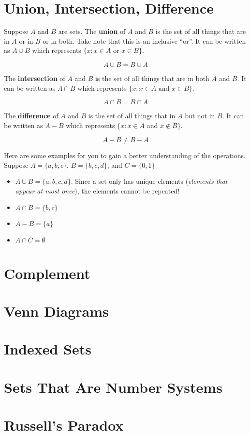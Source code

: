 \documentclass[../Latex-Setup/setup.tex]{subfiles}
\begin{document}
\section{Union, Intersection, Difference}

\indent Suppose $A$ and $B$ are sets. The \textbf{union} of $A$ and $B$ is the set of all things that are in $A$ or in $B$ or in both.
Take note that this is an inclusive ``or''. It can be written as $A \cup B$ which represents $\{x : x \in A \text{ or } x \in B\}$.\par

\[A \cup B = B \cup A\]
\par

\indent The \textbf{intersection} of $A$ and $B$ is the set of all things that are in both $A$ and $B$.
It can be written as $A \cap B$ which represents $\{x : x \in A \text{ and } x \in B\}$.\par

\[A \cap B = B \cap A\]
\par

\indent The \textbf{difference} of $A$ and $B$ is the set of all things that in $A$ but not in $B$.
It can be written as $A - B$ which represents $\{x : x \in A \text{ and } x \notin B\}$.\par

\[A - B \neq B - A\]
\par

\begin{example}
    \indent Here are some examples for you to gain a better understanding of the operations.
    Suppose $A = \{a,b,c\}$, $B = \{b,c,d\}$, and $C = \{0,1\}$\par
    \begin{itemize}
        \item $A \cup B = \{a,b,c,d\}$. Since a set only has unique elements (\textit{elements that appear at most once}), the elements cannot be repeated!
        \item $A \cap B = \{b,c\}$
        \item $A - B = \{a\}$
        \item $A \cap C = \emptyset$
    \end{itemize}
\end{example}


\section{Complement}
\section{Venn Diagrams}
\section{Indexed Sets}
\section{Sets That Are Number Systems}
\section{Russell's Paradox}
\end{document}
